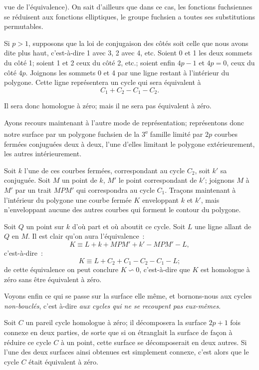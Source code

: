 \documentclass{article}
\begin{document}
vue de l'équivalence). On sait d'ailleurs que dans ce cas, les fonctions fuchsiennes se réduisent aux fonctions elliptiques, le groupe fuchsien a toutes ses substitutions permutables.

Si $p > 1$, supposons que la loi de conjugaison des côtés soit celle que nous avons dite plus haut, c'est-à-dire 1 avec 3, 2 avec 4, etc. Soient 0 et 1 les deux sommets du côté 1; soient 1 et 2 ceux du côté 2, etc.; soient enfin $4p - 1$ et $4p = 0$, ceux du côté $4p$. Joignons les sommets 0 et 4 par une ligne restant à l'intérieur du polygone. Cette ligne représentera un cycle qui sera équivalent à
\[ C_{1} + C_{2} - C_{1} - C_{2}. \]

Il sera donc homologue à zéro; mais il ne sera pas équivalent à zéro.

Ayons recours maintenant à l'autre mode de représentation; représentons donc notre surface par un polygone fuchsien de la 3\textsuperscript{e} famille limité par $2p$ courbes fermées conjuguées deux à deux, l'une d'elles limitant le polygone extérieurement, les autres intérieurement.

Soit $k$ l'une de ces courbes fermées, correspondant au cycle $C_{2}$, soit $k'$ sa conjuguée. Soit $M$ un point de $k$, $M'$ le point correspondant de $k'$; joignons $M$ à $M'$ par un trait $MPM'$ qui correspondra au cycle $C_{1}$. Traçons maintenant à l'intérieur du polygone une courbe fermée $K$ enveloppant $k$ et $k'$, mais n'enveloppant aucune des autres courbes qui forment le contour du polygone.

Soit $Q$ un point sur $k$ d'où part et où aboutit ce cycle. Soit $L$ une ligne allant de $Q$ en $M$. Il est clair qu'on aura l'équivalence~:
\[ K \equiv L + k + MPM' + k' - MPM' - L, \]
c'est-à-dire~:
\[ K \equiv L + C_{2} + C_{1} - C_{2} - C_{1} - L; \]
de cette équivalence on peut conclure $K \backsim 0$, c'est-à-dire que $K$ est homologue à zéro sans être équivalent à zéro.

Voyons enfin ce qui se passe sur la surface elle même, et bornons-nous aux cycles \emph{non-bouclés}, c'est à-dire \emph{aux cycles qui ne se recoupent pas eux-mêmes}.

Soit $C$ un pareil cycle homologue à zéro; il décomposera la surface $2p + 1$ fois connexe en deux parties, de sorte que si on étranglait la surface de façon à réduire ce cycle $C$ à un point, cette surface se décomposerait en deux autres. Si l'une des deux surfaces ainsi obtenues est simplement connexe, c'est alors que le cycle $C$ était équivalent à zéro.
\end{document}
